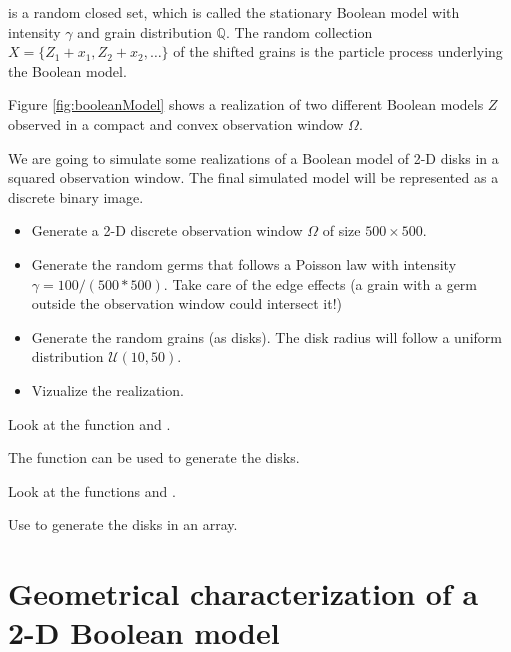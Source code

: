 \noindent is a random closed set, which is called the stationary Boolean model with intensity $\gamma$ and grain distribution $\mathbb{Q}$. The random collection $X=\{Z_1+x_1,Z_2+x_2,\dots\} $ of the shifted grains is the particle process underlying the Boolean model. 

Figure \ref{fig:booleanModel} shows a realization of two different Boolean models $Z$ observed in a compact and convex observation window $\Omega$.

We are going to simulate some realizations of a Boolean model of 2-D disks in a squared observation window. The final simulated model will be represented as a discrete binary image.

\begin{qbox}
\begin{itemize}
\item
Generate a 2-D discrete observation window $\Omega$ of size $500 \times 500$.
\item
Generate the random germs that follows a Poisson law with intensity $\gamma=100/(500*500)$. Take care of the edge effects (a grain with a germ outside the observation window could intersect it!)
\item Generate the random grains (as disks). The disk radius will follow a uniform distribution $\mathcal{U}(10,50)$.
\item Vizualize the realization.
\end{itemize}
\end{qbox}

\begin{mcomment}
\begin{mremark}
 Look at the \matlabregistered{} function  and .
 
 The  function can be used to generate the disks.
\end{mremark}
\end{mcomment}

\begin{pcomment}
\begin{premark}
 Look at the  functions  and .
 
 Use  to generate the disks in an array.
\end{premark}
\end{pcomment}
\vspace*{-8pt}
\section{Geometrical characterization of a 2-D Boo\-lean mo\-del}\vspace*{-8pt}

